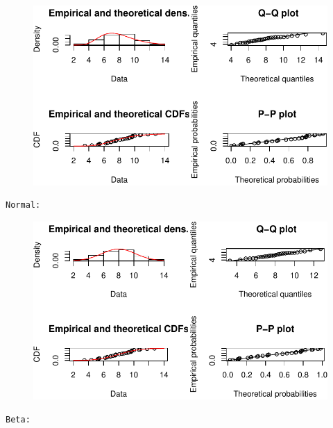 \documentclass[
  letterpaper,
  DIV=11,
  numbers=noendperiod]{scrartcl}
\begin{document}
\begin{figure}[H]

{\centering \includegraphics{quiz5_files/figure-pdf/unnamed-chunk-37-4.pdf}

}

\end{figure}

\begin{verbatim}
Normal: 
\end{verbatim}

\begin{figure}[H]

{\centering \includegraphics{quiz5_files/figure-pdf/unnamed-chunk-37-5.pdf}

}

\end{figure}

\begin{verbatim}
Beta: 
\end{verbatim}
\end{document}
